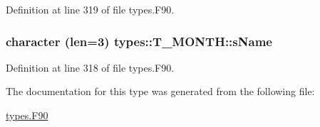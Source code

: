 Definition at line 319 of file types.F90.

\hypertarget{typetypes_1_1_t___m_o_n_t_h_ae9754c4c2c9df433af1f5659bc2aa796}{
\subsubsection[{sName}]{\setlength{\rightskip}{0pt plus 5cm}character (len=3) {\bf types::T\_\-MONTH::sName}}}
\label{typetypes_1_1_t___m_o_n_t_h_ae9754c4c2c9df433af1f5659bc2aa796}


Definition at line 318 of file types.F90.



The documentation for this type was generated from the following file:\begin{DoxyCompactItemize}
\item 
\hyperlink{types_8_f90}{types.F90}\end{DoxyCompactItemize}
